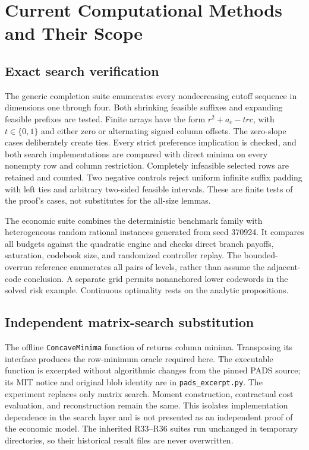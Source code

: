 \section{Current Computational Methods and Their Scope}\label{ec:r37-methods}
\subsection{Exact search verification}
The generic completion suite enumerates every nondecreasing cutoff sequence in dimensions one through four. Both shrinking feasible suffixes and expanding feasible prefixes are tested. Finite arrays have the form $r^2+a_c-trc$, with $t\in\{0,1\}$ and either zero or alternating signed column offsets. The zero-slope cases deliberately create ties. Every strict preference implication is checked, and both search implementations are compared with direct minima on every nonempty row and column restriction. Completely infeasible selected rows are retained and counted. Two negative controls reject uniform infinite suffix padding with left ties and arbitrary two-sided feasible intervals. These are finite tests of the proof's cases, not substitutes for the all-size lemmas.

The economic suite combines the deterministic benchmark family with heterogeneous random rational instances generated from seed 370924. It compares all budgets against the quadratic engine and checks direct branch payoffs, saturation, codebook size, and randomized controller replay. The bounded-overrun reference enumerates all pairs of levels, rather than assume the adjacent-code conclusion. A separate grid permits nonanchored lower codewords in the solved risk example. Continuous optimality rests on the analytic propositions.

\subsection{Independent matrix-search substitution}
The offline \texttt{ConcaveMinima} function of \citet{EppsteinPADS} returns column minima. Transposing its interface produces the row-minimum oracle required here. The executable function is excerpted without algorithmic changes from the pinned PADS source; its MIT notice and original blob identity are in \texttt{pads\_excerpt.py}. The experiment replaces only matrix search. Moment construction, contractual cost evaluation, and reconstruction remain the same. This isolates implementation dependence in the search layer and is not presented as an independent proof of the economic model. The inherited R33--R36 suites run unchanged in temporary directories, so their historical result files are never overwritten.

